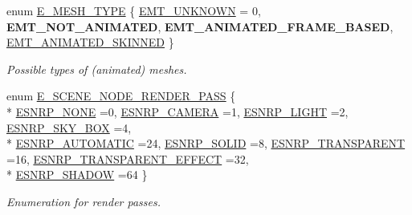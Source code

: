 \begin{DoxyCompactItemize}
\item 
enum \hyperlink{namespaceirr_1_1scene_aef0400177e5941293dff6640e800d11b}{E\+\_\+\+M\+E\+S\+H\+\_\+\+T\+Y\+PE} \{ \hyperlink{namespaceirr_1_1scene_aef0400177e5941293dff6640e800d11ba51877ce5eeb437cf506a5540e43736fb}{E\+M\+T\+\_\+\+U\+N\+K\+N\+O\+WN} = 0, 
{\bfseries E\+M\+T\+\_\+\+N\+O\+T\+\_\+\+A\+N\+I\+M\+A\+T\+ED}, 
{\bfseries E\+M\+T\+\_\+\+A\+N\+I\+M\+A\+T\+E\+D\+\_\+\+F\+R\+A\+M\+E\+\_\+\+B\+A\+S\+ED}, 
\hyperlink{namespaceirr_1_1scene_aef0400177e5941293dff6640e800d11ba4ea72dedeac9cf9f1b3635d4d07d38d7}{E\+M\+T\+\_\+\+A\+N\+I\+M\+A\+T\+E\+D\+\_\+\+S\+K\+I\+N\+N\+ED}
 \}\begin{DoxyCompactList}\small\item\em Possible types of (animated) meshes. \end{DoxyCompactList}
\item 
enum \hyperlink{namespaceirr_1_1scene_a7862269bd1abc123929d4dbb8200d67f}{E\+\_\+\+S\+C\+E\+N\+E\+\_\+\+N\+O\+D\+E\+\_\+\+R\+E\+N\+D\+E\+R\+\_\+\+P\+A\+SS} \{ \\*
\hyperlink{namespaceirr_1_1scene_a7862269bd1abc123929d4dbb8200d67fa1f79a46e7a41716dcae5c8dfe8d310bb}{E\+S\+N\+R\+P\+\_\+\+N\+O\+NE} =0, 
\hyperlink{namespaceirr_1_1scene_a7862269bd1abc123929d4dbb8200d67fa26f6af7911240e22003f327aef126053}{E\+S\+N\+R\+P\+\_\+\+C\+A\+M\+E\+RA} =1, 
\hyperlink{namespaceirr_1_1scene_a7862269bd1abc123929d4dbb8200d67fa1390daf021e4354eb3dc8d5d46fb7dc0}{E\+S\+N\+R\+P\+\_\+\+L\+I\+G\+HT} =2, 
\hyperlink{namespaceirr_1_1scene_a7862269bd1abc123929d4dbb8200d67fac41f4cb4900e84b9e55462089d0e3cb8}{E\+S\+N\+R\+P\+\_\+\+S\+K\+Y\+\_\+\+B\+OX} =4, 
\\*
\hyperlink{namespaceirr_1_1scene_a7862269bd1abc123929d4dbb8200d67fa5ceee6e4bc2fab42c663b32018e276e8}{E\+S\+N\+R\+P\+\_\+\+A\+U\+T\+O\+M\+A\+T\+IC} =24, 
\hyperlink{namespaceirr_1_1scene_a7862269bd1abc123929d4dbb8200d67fad058b020ab42ad745cc03fe379148e1f}{E\+S\+N\+R\+P\+\_\+\+S\+O\+L\+ID} =8, 
\hyperlink{namespaceirr_1_1scene_a7862269bd1abc123929d4dbb8200d67fad3a1300505d0ab06133e25256b893b2b}{E\+S\+N\+R\+P\+\_\+\+T\+R\+A\+N\+S\+P\+A\+R\+E\+NT} =16, 
\hyperlink{namespaceirr_1_1scene_a7862269bd1abc123929d4dbb8200d67fa3d134d3f703e328ab5798e5ff4a5c186}{E\+S\+N\+R\+P\+\_\+\+T\+R\+A\+N\+S\+P\+A\+R\+E\+N\+T\+\_\+\+E\+F\+F\+E\+CT} =32, 
\\*
\hyperlink{namespaceirr_1_1scene_a7862269bd1abc123929d4dbb8200d67fadbc7353e3092974abaa4d063faa22421}{E\+S\+N\+R\+P\+\_\+\+S\+H\+A\+D\+OW} =64
 \}\begin{DoxyCompactList}\small\item\em Enumeration for render passes. \end{DoxyCompactList}
\end{DoxyCompactItemize}
